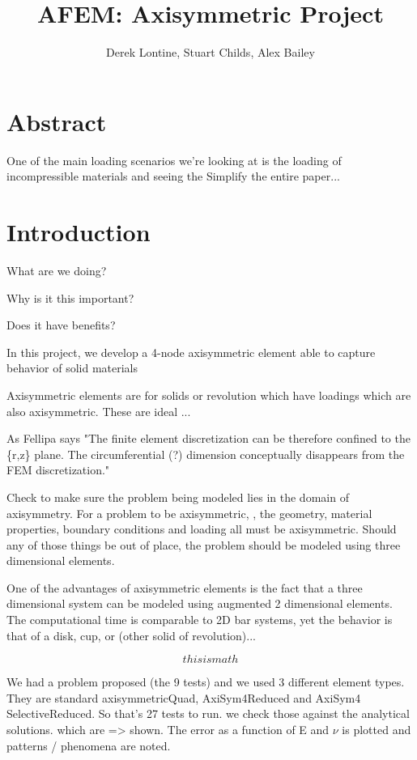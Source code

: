 \documentclass[10pt,letterpaper]{report}
\author{Derek Lontine, Stuart Childs, Alex Bailey}
\title{AFEM: Axisymmetric Project}
\numberwithin{equation}{chapter}
\begin{document}
\maketitle
\chapter{Abstract}

One of the main loading scenarios we're looking at is the loading of incompressible materials and seeing the 
Simplify the entire paper...
\chapter{Introduction}

What are we doing?

Why is it this important?

Does it have benefits?

In this project, we develop a 4-node axisymmetric element able to capture behavior of solid materials %

Axisymmetric elements are for solids or revolution which have loadings which are also axisymmetric.  These are ideal ...

As Fellipa says "The finite element discretization can be therefore confined to the \{r,z\} plane. The circumferential
(?) dimension conceptually disappears from the FEM discretization."

Check to make sure the problem being modeled lies in the domain of 
axisymmetry. For a problem to be axisymmetric, , the geometry, material properties, boundary conditions and loading all must be axisymmetric.  Should any of those things be out of place, the problem should be modeled using three dimensional elements.  

One of the advantages of axisymmetric elements is the fact that a three dimensional system can be modeled using augmented 2 dimensional elements.  The computational time is comparable to 2D bar systems, yet the behavior is that of a disk, cup, or (other solid of revolution)...

\[
this is math
\]

We had a problem proposed (the 9 tests) and we used 3 different element types. They are standard axisymmetricQuad, AxiSym4Reduced and AxiSym4 SelectiveReduced.  So that's 27 tests to run. we check those against the analytical solutions. which are => shown.  The error as a function of E and $\nu$ is plotted and patterns / phenomena are noted.
\end{document}
